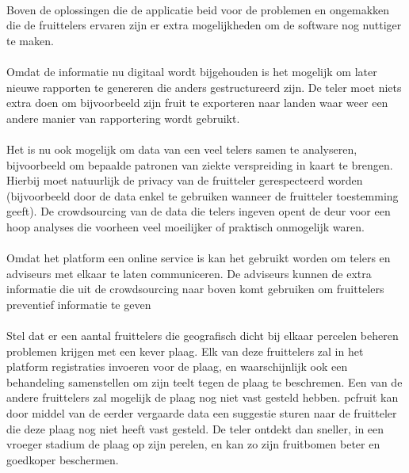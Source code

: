 \paragraph {} Boven de oplossingen die de applicatie beid voor de problemen en ongemakken
die de fruittelers ervaren zijn er extra mogelijkheden om de software nog nuttiger te
maken.

\paragraph {} Omdat de informatie nu digitaal wordt bijgehouden is het mogelijk om later
nieuwe rapporten te genereren die anders gestructureerd zijn. De teler moet niets extra
doen om bijvoorbeeld zijn fruit te exporteren naar landen waar weer een andere manier van
rapportering wordt gebruikt.

\paragraph {} Het is nu ook mogelijk om data van een
veel telers samen te analyseren, bijvoorbeeld om bepaalde patronen van ziekte verspreiding
in kaart te brengen. Hierbij moet natuurlijk de privacy van de fruitteler gerespecteerd
worden (bijvoorbeeld door de data enkel te gebruiken wanneer de fruitteler toestemming
geeft). De crowdsourcing van de data die telers ingeven opent de deur voor een hoop
analyses die voorheen veel moeilijker of praktisch onmogelijk waren.

\paragraph {} Omdat het platform een online service is kan het gebruikt worden om telers
en adviseurs met elkaar te laten communiceren. De adviseurs kunnen de extra informatie die
uit de crowdsourcing naar boven komt gebruiken om fruittelers preventief informatie te
geven

\paragraph {} Stel dat er een aantal fruittelers die geografisch dicht bij elkaar percelen
beheren problemen krijgen met een kever plaag. Elk van deze fruittelers zal in het
platform registraties invoeren voor de plaag, en waarschijnlijk ook een behandeling
samenstellen om zijn teelt tegen de plaag te beschremen. Een van de andere fruittelers zal
mogelijk de plaag nog niet vast gesteld hebben. pcfruit kan door middel van de eerder
vergaarde data een suggestie sturen naar de fruitteler die deze plaag nog niet heeft vast
gesteld. De teler ontdekt dan sneller, in een vroeger stadium de plaag op zijn perelen, en
kan zo zijn fruitbomen beter en goedkoper beschermen.

